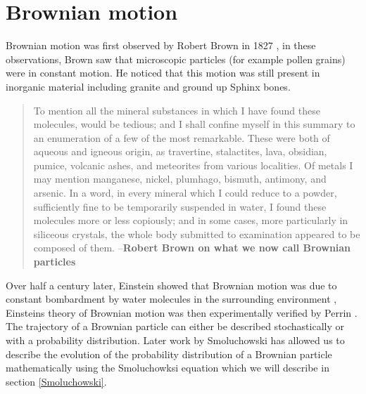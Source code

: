 \section{Brownian motion}
Brownian motion was first observed by Robert Brown in 1827 \cite{Brown1828}, in these observations, Brown saw that microscopic particles (for example pollen grains) were in constant motion. He noticed that this motion was still present in inorganic material including granite and ground up Sphinx bones. 
\begin{quote}
To mention all the mineral substances in which I have found these molecules, would be tedious; and I shall confine myself in this summary to an enumeration of a few of the most remarkable. These were both of aqueous and igneous origin, as travertine, stalactites, lava, obsidian, pumice, volcanic ashes, and meteorites from various localities. Of metals I may mention manganese, nickel, plumhago, bismuth, antimony, and arsenic. In a word, in every mineral which I could reduce to a powder, sufficiently fine to be temporarily suspended in water, I found these molecules more or less copiously; and in some cases, more particularly in siliceous crystals, the whole body submitted to examination appeared to be composed of them. --\textbf{Robert Brown on what we now call Brownian particles}
\end{quote}
Over half a century later, Einstein showed that Brownian motion was due to constant bombardment by water molecules in the surrounding environment \cite{Einstein1905}, Einsteins theory of Brownian motion was then experimentally verified by Perrin \cite{Perrin2013}. The trajectory of a Brownian particle can either be described stochastically or with a probability distribution. Later work by Smoluchowski has allowed us to describe the evolution of the probability distribution of a Brownian particle mathematically using the Smoluchowksi equation which we will describe in section \ref{Smoluchowski}.

